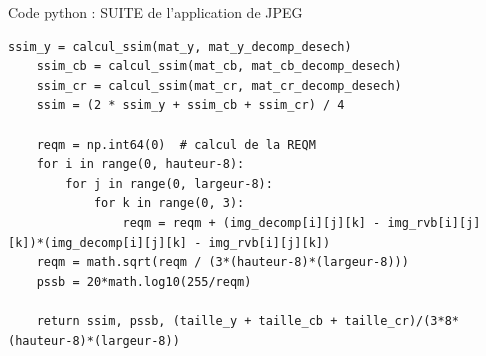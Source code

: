 \documentclass[xcolor=dvipsnames]{beamer}
\begin{document}
\begin{frame}[fragile]{Code python : SUITE de l'application de JPEG}
    \begin{lstlisting}[style=pythonStyle]
    ssim_y = calcul_ssim(mat_y, mat_y_decomp_desech)
    ssim_cb = calcul_ssim(mat_cb, mat_cb_decomp_desech)
    ssim_cr = calcul_ssim(mat_cr, mat_cr_decomp_desech)
    ssim = (2 * ssim_y + ssim_cb + ssim_cr) / 4

    reqm = np.int64(0)  # calcul de la REQM
    for i in range(0, hauteur-8):
        for j in range(0, largeur-8):
            for k in range(0, 3):
                reqm = reqm + (img_decomp[i][j][k] - img_rvb[i][j][k])*(img_decomp[i][j][k] - img_rvb[i][j][k])
    reqm = math.sqrt(reqm / (3*(hauteur-8)*(largeur-8)))
    pssb = 20*math.log10(255/reqm)

    return ssim, pssb, (taille_y + taille_cb + taille_cr)/(3*8*(hauteur-8)*(largeur-8))

    \end{lstlisting}
\end{frame}
\end{document}

